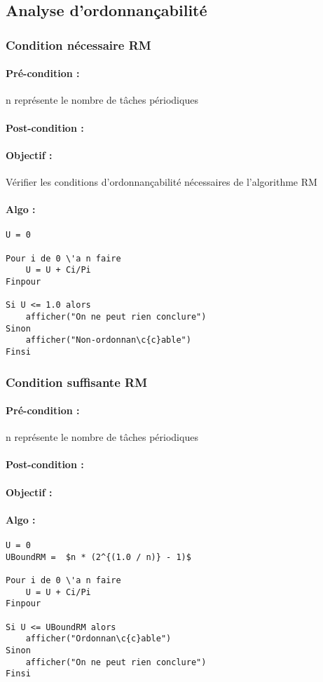 		
		\subsection{Analyse d'ordonnançabilité}
			
			\subsubsection{Condition nécessaire RM}
				\paragraph{Pré-condition :} n représente le nombre de tâches périodiques
				\paragraph{Post-condition :} 
				\paragraph{Objectif :} Vérifier les conditions d'ordonnançabilité nécessaires de l'algorithme RM 
				\paragraph{Algo :} 
					\begin{lstlisting}
U = 0
					
Pour i de 0 \'a n faire
	U = U + Ci/Pi
Finpour		

Si U <= 1.0 alors
	afficher("On ne peut rien conclure")
Sinon
	afficher("Non-ordonnan\c{c}able")
Finsi
					\end{lstlisting}
			
			\subsubsection{Condition suffisante RM}
				\paragraph{Pré-condition :} n représente le nombre de tâches périodiques
				\paragraph{Post-condition :} 
				\paragraph{Objectif :} 
				\paragraph{Algo :} 
					\begin{lstlisting}
U = 0
UBoundRM =  $n * (2^{(1.0 / n)} - 1)$
					
Pour i de 0 \'a n faire
	U = U + Ci/Pi
Finpour

Si U <= UBoundRM alors
	afficher("Ordonnan\c{c}able")
Sinon
	afficher("On ne peut rien conclure")
Finsi
					\end{lstlisting}
			
